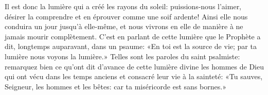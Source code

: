 Il est donc la lumière qui a créé les rayons du soleil:
	puissions-nous l’aimer, désirer la comprendre
	et en éprouver comme une soif ardente!
Ainsi elle nous conduira un jour jusqu’à elle-même,
	et nous vivrons en elle de manière à ne jamais mourir complètement.
C’est en parlant de cette lumière
	que le Prophète a dit, longtemps auparavant, dans un psaume:
	«En toi est la source de vie; par ta lumière nous voyons la lumière.»
Telles sont les paroles du saint psalmiste:
	remarquez bien ce qu’ont dit d’avance de cette lumière divine
	les hommes de Dieu qui ont vécu dans les temps anciens
	et consacré leur vie à la sainteté:
	«Tu sauves, Seigneur, les hommes et les bêtes:
	car ta miséricorde est sans bornes.»
